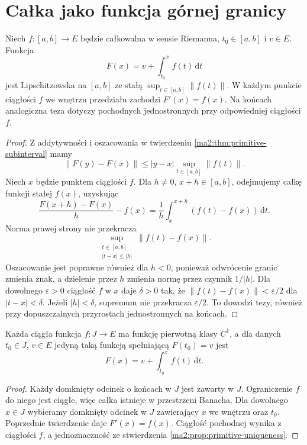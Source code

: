 \section{Całka jako funkcja górnej granicy}

\begin{twierdzenie}
\label{ma2:thm:primitive-ftc}
Niech $f:[a,b]\to E$ będzie całkowalna
w sensie Riemanna, $t_0\in[a,b]$ i $v\in E$.
Funkcja
\[
 F(x)=v+\int_{t_0}^x f(t)\,\mathrm dt
\]
jest Lipschitzowska na $[a,b]$ ze stałą
$\sup_{t\in[a,b]}\|f(t)\|$.
W każdym punkcie ciągłości $f$ we wnętrzu
przedziału zachodzi $F'(x)=f(x)$.
Na końcach analogiczna teza dotyczy pochodnych
jednostronnych przy odpowiedniej ciągłości $f$.
\end{twierdzenie}
\begin{proof}
Z addytywności i oszacowania w twierdzeniu
\ref{ma2:thm:primitive-subinterval} mamy
\[
 \|F(y)-F(x)\|\le |y-x|\sup_{t\in[a,b]}\|f(t)\|.
\]
Niech $x$ będzie punktem ciągłości $f$.
Dla $h\ne0$, $x+h\in[a,b]$, odejmujemy
całkę funkcji stałej $f(x)$, uzyskując
\[
 \frac{F(x+h)-F(x)}h-f(x)
 =\frac1h\int_x^{x+h}(f(t)-f(x))\,\mathrm dt.
\]
Norma prawej strony nie przekracza
\[
 \sup_{\substack{t\in[a,b]\\|t-x|\le |h|}}
 \|f(t)-f(x)\|.
\]
Oszacowanie jest poprawne również dla $h<0$,
ponieważ odwrócenie granic zmienia znak,
a dzielenie przez $h$ zmienia normę przez
czynnik $1/|h|$. Dla dowolnego $\varepsilon>0$
ciągłość $f$ w $x$ daje $\delta>0$ tak, że
$\|f(t)-f(x)\|<\varepsilon/2$ dla
$|t-x|<\delta$. Jeżeli $|h|<\delta$,
supremum nie przekracza $\varepsilon/2$.
To dowodzi tezy, również przy dopuszczalnych
przyrostach jednostronnych na końcach.
\end{proof}

\begin{wniosek}
\label{ma2:cor:primitive-exists}
Każda ciągła funkcja $f:J\to E$ ma funkcję
pierwotną klasy $C^1$, a dla danych
$t_0\in J$, $v\in E$ jedyną taką funkcją
spełniającą $F(t_0)=v$ jest
\[
 F(x)=v+\int_{t_0}^x f(t)\,\mathrm dt.
\]
\end{wniosek}
\begin{proof}
Każdy domknięty odcinek o końcach w $J$
jest zawarty w $J$. Ograniczenie $f$
do niego jest ciągłe, więc całka istnieje
w przestrzeni Banacha.
Dla dowolnego $x\in J$ wybieramy domknięty
odcinek w $J$ zawierający $x$ we wnętrzu
oraz $t_0$. Poprzednie twierdzenie daje
$F'(x)=f(x)$. Ciągłość pochodnej wynika
z ciągłości $f$, a jednoznaczność ze
stwierdzenia \ref{ma2:prop:primitive-uniqueness}.
\end{proof}

